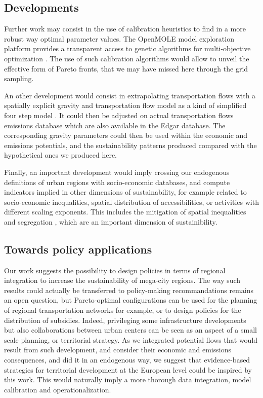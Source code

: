\documentclass{article}
\begin{document}
\subsection{Developments}

Further work may consist in the use of calibration heuristics to find in a more robust way optimal parameter values. The OpenMOLE model exploration platform provides a transparent access to genetic algorithms for multi-objective optimization \citep{reuillon2013openmole}. The use of such calibration algorithms would allow to unveil the effective form of Pareto fronts, that we may have missed here through the grid sampling.


An other development would consist in extrapolating transportation flows with a spatially explicit gravity and transportation flow model as a kind of simplified four step model \citep{mcnally2000four}. It could then be adjusted on actual transportation flows emissions database which are also available in the Edgar database. The corresponding gravity parameters could then be used within the economic and emissions potentials, and the sustainability patterns produced compared with the hypothetical ones we produced here.

Finally, an important development would imply crossing our endogenous definitions of urban regions with socio-economic databases, and compute indicators implied in other dimensions of sustainability, for example related to socio-economic inequalities, spatial distribution of accessibilities, or activities with different scaling exponents. This includes the mitigation of spatial inequalities and segregation \citep{tammaru2015multi}, which are an important dimension of sustainibility.



\subsection{Towards policy applications}


Our work suggests the possibility to design policies in terms of regional integration to increase the sustainability of mega-city regions. The way such results could actually be transferred to policy-making recommandations remains an open question, but Pareto-optimal configurations can be used for the planning of regional transportation networks for example, or to design policies for the distribution of subsidies. Indeed, privileging some infrastructure developments but also collaborations between urban centers can be seen as an aspect of a small scale planning, or territorial strategy. As we integrated potential flows that would result from such development, and consider their economic and emissions consequences, and did it in an endogenous way, we suggest that evidence-based strategies for territorial development at the European level could be inspired by this work. This would naturally imply a more thorough data integration, model calibration and operationalization.
\end{document}
